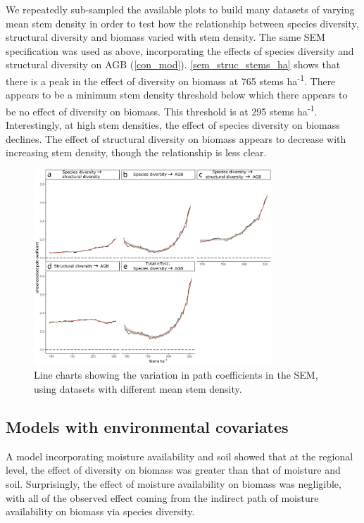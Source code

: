 \documentclass[11pt,a4paper]{article}
\begin{document}
We repeatedly sub-sampled the available plots to build many datasets of varying mean stem density in order to test how the relationship between species diversity, structural diversity and biomass varied with stem density. The same SEM specification was used as above, incorporating the effects of species diversity and structural diversity on AGB (\autoref{con_mod}).  \autoref{sem_struc_stems_ha} shows that there is a peak in the effect of diversity on biomass at \textapprox{}765 stems ha\textsuperscript{-1}. There appears to be a minimum stem density threshold below which there appears to be no effect of diversity on biomass. This threshold is at \textapprox{}295 stems ha\textsuperscript{-1}. Interestingly, at high stem densities, the effect of species diversity on biomass declines. The effect of structural diversity on biomass appears to decrease with increasing stem density, though the relationship is less clear. 

\begin{figure}[H]
\centering
	\includegraphics[width=0.8\textwidth]{sem_struc_stems_ha}
	\caption{Line charts showing the variation in path coefficients in the SEM, using datasets with different mean stem density.}
	\label{sem_struc_stems_ha}
\end{figure}

\subsection{Models with environmental covariates}

A model incorporating moisture availability and soil showed that at the regional level, the effect of diversity on biomass was greater than that of moisture and soil. Surprisingly, the effect of moisture availability on biomass was negligible, with all of the observed effect coming from the indirect path of moisture availability on biomass via species diversity. 
\end{document}

